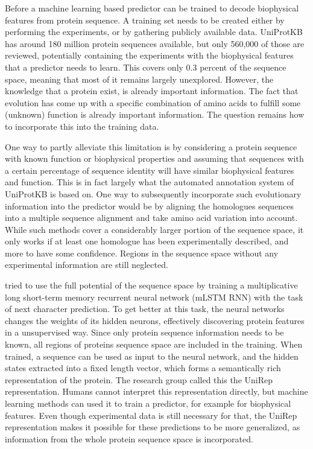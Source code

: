 Before a machine learning based predictor can be trained to decode biophysical features from protein sequence.
A training set needs to be created either by performing the experiments,
or by gathering publicly available data.
UniProtKB has around 180 million protein sequences available,
but only 560,000 of those are reviewed, 
potentially containing the experiments with the biophysical features that a predictor needs to learn.
This covers only 0.3 percent of the sequence space, 
meaning that most of it remains largely unexplored.
However, the knowledge that a protein exist, is already important information.
The fact that evolution has come up with a specific combination of amino acids to fulfill some (unknown) function is already important information. 
The question remains how to incorporate this into the training data.

One way to partly alleviate this limitation is by considering a protein sequence with known function or biophysical properties and assuming that sequences with a certain percentage of sequence identity will have similar biophysical features and function.
This is in fact largely what the automated annotation system of UniProtKB is based on.
One way to subsequently incorporate such evolutionary information into the predictor would be by aligning the homologues sequences into a multiple sequence alignment and take amino acid variation into account.
While such methods cover a considerably larger portion of the sequence space, 
it only works if at least one homologue has been experimentally described, and more to have some confidence.
Regions in the sequence space without any experimental information are still neglected.

\cite{alley2019} tried to use the full potential of the sequence space by training a 
multiplicative long short-term memory recurrent neural network
(mLSTM RNN) with the task of next character prediction.
To get better at this task,
the neural networks changes the weights of its hidden neurons,
effectively discovering protein features in a unsupervised way.
Since only protein sequence information needs to be known,
all regions of proteins sequence space are included in the training.
When trained, a sequence can be used as input to the neural network,
and the hidden states extracted into a fixed length vector,
which forms a semantically rich representation of the protein.
The research group called this the UniRep representation.
Humans cannot interpret this representation directly,
but machine learning methods can used it to train a predictor, 
for example for biophysical features.
Even though experimental data is still necessary for that,
the UniRep representation makes it possible for these predictions to be more generalized,
as information from the whole protein sequence space is incorporated.

